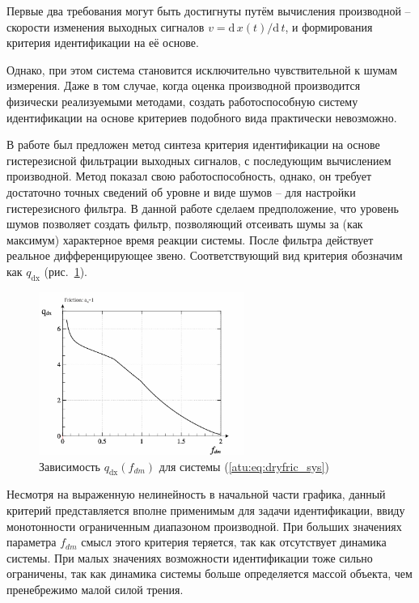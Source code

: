Первые два требования
могут быть достигнуты путём вычисления производной --
скорости изменения выходных сигналов
\(v = \mathrm{d}\,x(t)/ \mathrm{d}\,t \),
и формирования критерия идентификации на её основе.

Однако, при этом система становится исключительно чувствительной
к шумам измерения. Даже в том случае, когда
оценка производной производится физически реализуемыми методами,
создать работоспособную систему идентификации на основе критериев
подобного вида практически невозможно.

В работе \cite{atu_asau11} был предложен метод синтеза критерия идентификации
на основе гистерезисной фильтрации выходных сигналов, с последующим
вычислением производной. Метод показал свою работоспособность, однако,
он требует достаточно точных сведений об уровне и виде шумов -- для
настройки гистерезисного фильтра. В данной работе сделаем предположение,
что уровень шумов позволяет создать фильтр, позволяющий отсеивать шумы
за (как максимум) характерное время реакции системы.
После фильтра действует реальное дифференцирующее звено.
Соответствующий вид критерия обозначим как $ q_\mathrm{dx} $ (рис.~\ref{atu:f:fric_q}).



\begin{figure}[htb!]
\centerline{
  \includegraphics[width=0.60\textwidth]{p/cha/fric/fric_q-p_f_dm_q.png}
}
  \caption{Зависимость $q_\mathrm{dx}(f_{dm})$ для системы (\ref{atu:eq:dryfric_sys}) }
\label{atu:f:fric_q}
\end{figure}

Несмотря на выраженную нелинейность в начальной части графика,
данный критерий представляется вполне применимым для задачи идентификации,
ввиду монотонности ограниченным диапазоном производной.
При больших значениях параметра $f_{dm}$ смысл этого критерия теряется,
так как отсутствует динамика системы. При малых значениях возможности идентификации
тоже сильно ограничены, так как динамика системы больше определяется
массой объекта, чем пренебрежимо малой силой трения.

